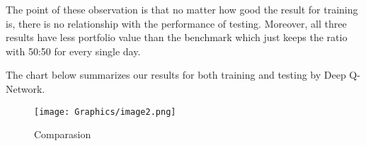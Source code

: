 The point of these observation is that no matter how good the result for training is, there is no relationship with the performance of testing. Moreover, all three results have less portfolio value than the benchmark which just keeps the ratio with 50:50 for every single day. 

The chart below summarizes our results for both training and testing by Deep Q-Network. 

\begin{figure}[H]
\begin{center}
\texttt{[image: Graphics/image2.png]} \caption{Comparasion}
\end{center}
\end{figure}

